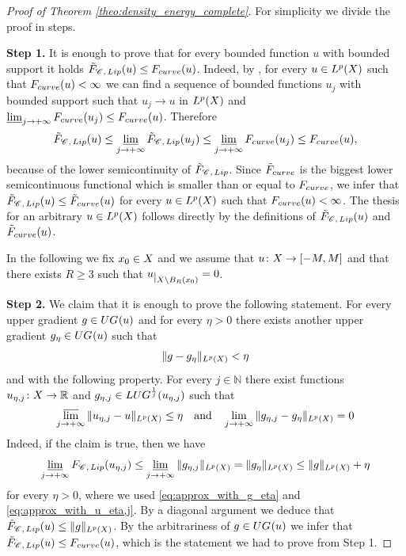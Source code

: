 \documentclass[12pt]{amsart}
\newcommand{\N}{\mathbb{N}}
\newcommand{\R}{\mathbb{R}}
\newcommand{\restr}[1]{\lower3pt\hbox{$|_{#1}$}}
\newcommand{\limi}{\varliminf}
\newcommand{\lims}{\varlimsup}
\newcommand{\X}{{\rm X}}
\newcommand{\Lip}{{\rm Lip}}
\newcommand{\F}{{\rm F}}
\theoremstyle{definition}
\newcommand{\Chain}[1]{\mathscr{C}^{#1}}
\newcommand{\UG}[1]{{\rm UG}^{#1}}
\newcommand{\LUG}[1]{{\rm LUG}^{#1}}
\renewcommand{\F}[1]{{\rm F}_{{\rm #1}}}
\newcommand{\relF}[1]{\tilde{\rm F}_{{\rm #1}}}
\begin{document}
\begin{proof}[Proof of Theorem \ref{theo:density_energy_complete}]
    For simplicity we divide the proof in steps. 
    \vspace{2mm}
    
    {\bf Step 1.} It is enough to prove that for every bounded function $u$ with bounded support it holds $\relF{\Chain{},\,\Lip}(u) \le \F{curve}(u)$. 
    Indeed, by \cite[Proposition 7.1.35]{HKST15}, for every $u\in L^p(\X)$ such that $\F{curve}(u) < \infty$ we can find a sequence of bounded functions $u_j$ with bounded support such that $u_j \to u$ in $L^p(\X)$ and $\limi_{j\to +\infty}\F{curve}(u_j) \le \F{curve}(u)$. Therefore 
    $$\relF{\Chain{},\,\Lip}(u) \le \limi_{j\to +\infty}\relF{\Chain{},\,\Lip}(u_j) \le \limi_{j\to +\infty}\F{curve}(u_j) \le \F{curve}(u),$$
    because of the lower semicontinuity of $\relF{\Chain{},\,\Lip}$. Since $\relF{curve}$ is the biggest lower semicontinuous functional which is smaller than or equal to $\F{curve}$, we infer that $\relF{\Chain{},\,\Lip}(u) \le \relF{curve}(u)$ for every $u\in L^p(\X)$ such that $\F{curve}(u) < \infty$. The thesis for an arbitrary $u\in L^p(\X)$ follows directly by the definitions of $\relF{\Chain{},\,\Lip}(u)$ and $\relF{curve}(u)$.
    \vspace{2mm}

    In the following we fix $x_0\in \X$ and we assume that $u\colon \X \to [-M,M]$ and that there exists $R\ge 3$ such that $u\restr{\X\setminus B_R(x_0)} = 0$. 
    \vspace{2mm}
    
    {\bf Step 2.} We claim that it is enough to prove the following statement. For every upper gradient $g\in \UG{}(u)$ and for every $\eta > 0$ there exists another upper gradient $g_\eta \in \UG{}(u)$ such that 
    \begin{equation}
        \label{eq:approx_with_g_eta}
        \Vert g - g_\eta \Vert_{L^p(\X)} < \eta
    \end{equation} 
    and with the following property. For every $j\in \N$ there exist functions $u_{\eta,j} \colon \X \to \R$ and $g_{\eta,j}\in \LUG{\frac{1}{j}}(u_{\eta,j})$ such that 
    \begin{equation}
        \label{eq:approx_with_u_eta,j}
        \lims_{j\to +\infty} \Vert u_{\eta,j} - u \Vert_{L^p(\X)} \le \eta \quad \text{and} \quad \lim_{j\to +\infty} \Vert g_{\eta,j} - g_\eta \Vert_{L^p(\X)} = 0
    \end{equation}
    Indeed, if the claim is true, then we have
        \begin{equation}
            \limi_{j\to +\infty}\F{\Chain{},\, \Lip}(u_{\eta,j}) \le \limi_{j\to +\infty} \Vert g_{\eta,j}\Vert_{L^p(\X)}= \Vert g_{\eta}\Vert_{L^p(\X)} \le \Vert g\Vert_{L^p(\X)} + \eta
        \end{equation}
    for every $\eta > 0$, where we used \eqref{eq:approx_with_g_eta} and \eqref{eq:approx_with_u_eta,j}. By a diagonal argument we deduce that $\relF{\Chain{},\,\Lip}(u)\le \Vert g\Vert_{L^p(\X)}$. By the arbitrariness of $g\in \UG{}(u)$ we infer that $\relF{\Chain{},\,\Lip}(u) \le \F{curve}(u)$, which is the statement we had to prove from Step 1.
    \vspace{2mm}


\end{proof}
\end{document}
